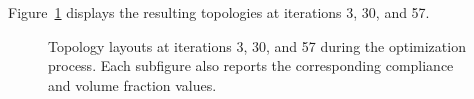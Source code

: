 \documentclass[mathpazo]{cicp}
\begin{document}
Figure~\ref{fig:canti_04_all} displays the resulting topologies at iterations 3, 30, and 57.
\begin{figure}[htp]
	\centering
	\caption{Topology layouts at iterations 3, 30, and 57 during the optimization process. Each subfigure also reports the corresponding compliance and volume fraction values.}
	\label{fig:canti_04_all}
\end{figure}
\end{document}
